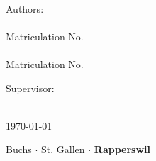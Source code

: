 \begin{titlepage}
	

	\center
	\vspace{2cm}
	{\color{OSTpurple}\fontsize{21}{20}{\textsf{\Title}}}\\
	\vspace{0.5cm}
	\color{black}
	{\fontsize{15}{20}{\textsf{\Subtitle}}}\\
	\vspace{3cm}
	

	
	\color{black}
	
	{\ModulInfo}\\
	{\Studiengang}\\
	{\Profile}\\
	{\Semester}\\

	\vspace{1.5cm}
	
	Authors:\\
	{\textbf\AuthorA}\\
	{\small Matriculation No. \AuthorAMatrikel}\\
	
	\vspace{.5cm}
	{\textbf\AuthorB}\\
	{\small Matriculation No. \AuthorBMatrikel}\\




	\vspace{1.5cm}

	\color{black}



	\color{black}
	Supervisor:\\ \textbf{\Supervisor}\\
		
		


	\vspace{3.5cm}

  
	\titledate\today

	 
	 \vfill
	 \begin{flushright}
	 	\vfill
	 	\color{OSTpurple}\small\textsf{
	 		Buchs $ \cdot $ St. Gallen $ \cdot $ \textbf{Rapperswil}
	 	}
	 \end{flushright}
	



\end{titlepage}
